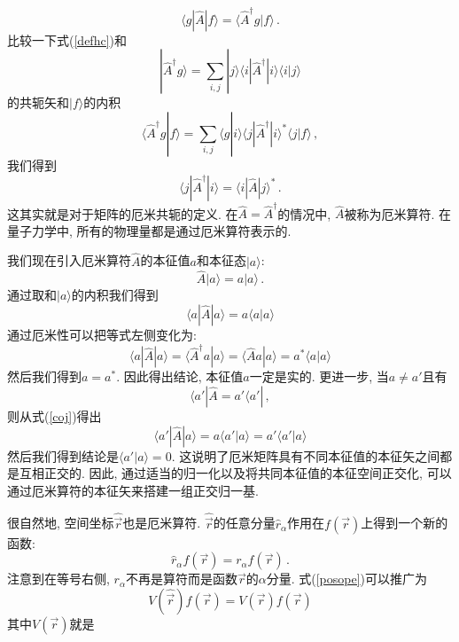 \documentclass[b5paper]{book}
\begin{document}
\begin{equation}\label{defhc}
\langle g|\hat{A}|f\rangle =\langle \hat{A}^\dagger g|f\rangle\,.
\end{equation}
比较一下式(\ref{defhc})和
\begin{equation}
|\hat{A}^\dagger g\rangle =\sum_{i,j}|j\rangle\langle i|\hat{A}^\dagger|i\rangle\langle i|j\rangle
\end{equation}
的共轭矢和$|f\rangle$的内积 
\begin{equation}
\langle \hat{A}^\dagger g|f\rangle=\sum_{i,j}\langle g|i\rangle \langle j|\hat{A}^\dagger|i\rangle^*\langle j|f\rangle\,,
\end{equation}
我们得到
\begin{equation}
\langle j|\hat{A}^\dagger|i\rangle =\langle i|\hat{A}|j\rangle^*\,.
\end{equation}
这其实就是对于矩阵的厄米共轭的定义. 在$\hat{A}=\hat{A}^\dagger$的情况中, $\hat{A}$被称为厄米算符. 在量子力学中, 所有的物理量都是通过厄米算符表示的.

我们现在引入厄米算符$\hat{A}$的本征值$a$和本征态$|a\rangle$:
\begin{equation}
\hat{A}|a\rangle= a |a\rangle\,.
\end{equation}
通过取和$|a\rangle$的内积我们得到
\begin{equation}
\langle a|\hat{A}|a\rangle = a \langle a|a\rangle
\end{equation}
通过厄米性可以把等式左侧变化为:
\begin{equation}\label{coj}
\langle a|\hat{A}|a\rangle = \langle \hat{A}^\dagger a |a\rangle =\langle \hat{A}a|a\rangle =a^*\langle a|a \rangle
\end{equation}
然后我们得到$a=a^*$. 因此得出结论, 本征值$a$一定是实的. 更进一步, 当$a\neq a'$且有
\begin{equation}
\langle a'|\hat{A}=a'\langle a'|\,,
\end{equation}
则从式(\ref{coj})得出
\begin{equation}
\langle a'|\hat{A}|a\rangle = a\langle a'|a\rangle =a'\langle a'|a \rangle
\end{equation}
然后我们得到结论是$\langle a'|a\rangle =0$. 这说明了厄米矩阵具有不同本征值的本征矢之间都是互相正交的. 因此, 通过适当的归一化以及将共同本征值的本征空间正交化, 可以通过厄米算符的本征矢来搭建一组正交归一基.

很自然地, 空间坐标$\hat{\vec{r}}$也是厄米算符. $\hat{\vec{r}}$的任意分量$\hat{r}_\alpha$作用在$f(\vec{r})$上得到一个新的函数:
\begin{equation}\label{posope}
\hat{r}_\alpha f(\vec{r})=r_\alpha f(\vec{r})\,.
\end{equation}
注意到在等号右侧, $r_\alpha$不再是算符而是函数$\vec{r}$的$\alpha$分量. 式(\ref{posope})可以推广为
\begin{equation}
V(\hat{\vec{r}})f(\vec{r})=V(\vec{r})f(\vec{r})
\end{equation}
其中$V(\vec{r})$就是
\end{document}
